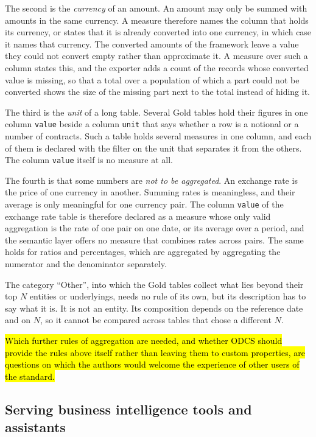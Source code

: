 \documentclass[a4paper, 11pt]{report}
\begin{document}
The second is the \emph{currency} of an amount. An amount may only be summed with amounts in the same currency. A measure therefore names the column that holds its currency, or states that it is already converted into one currency, in which case it names that currency. The converted amounts of the framework leave a value they could not convert empty rather than approximate it. A measure over such a column states this, and the exporter adds a count of the records whose converted value is missing, so that a total over a population of which a part could not be converted shows the size of the missing part next to the total instead of hiding it.

The third is the \emph{unit} of a long table. Several Gold tables hold their figures in one column \verb|value| beside a column \verb|unit| that says whether a row is a notional or a number of contracts. Such a table holds several measures in one column, and each of them is declared with the filter on the unit that separates it from the others. The column \verb|value| itself is no measure at all.

The fourth is that some numbers are \emph{not to be aggregated}. An exchange rate is the price of one currency in another. Summing rates is meaningless, and their average is only meaningful for one currency pair. The column \verb|value| of the exchange rate table is therefore declared as a measure whose only valid aggregation is the rate of one pair on one date, or its average over a period, and the semantic layer offers no measure that combines rates across pairs. The same holds for ratios and percentages, which are aggregated by aggregating the numerator and the denominator separately.

The category ``Other'', into which the Gold tables collect what lies beyond their top $N$ entities or underlyings, needs no rule of its own, but its description has to say what it is. It is not an entity. Its composition depends on the reference date and on $N$, so it cannot be compared across tables that chose a different $N$.

\hl{Which further rules of aggregation are needed, and whether ODCS should provide the rules above itself rather than leaving them to custom properties, are questions on which the authors would welcome the experience of other users of the standard.}

\subsection{Serving business intelligence tools and assistants}
\end{document}
